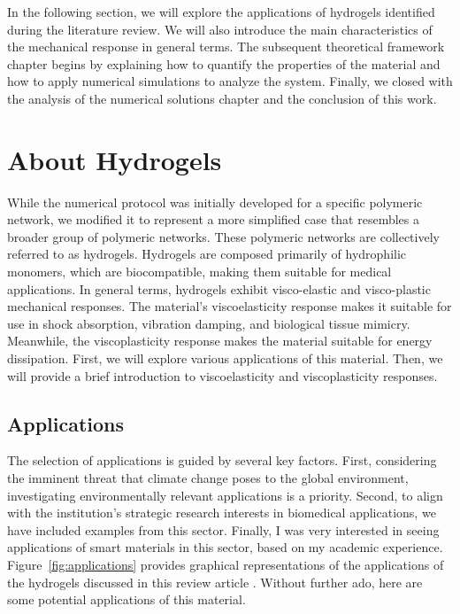 In the following section, we will explore the applications of hydrogels identified during the literature review. 
We will also introduce the main characteristics of the mechanical response in general terms.
The subsequent theoretical framework chapter begins by explaining how to quantify the properties of the material and how to apply numerical simulations to analyze the system.
Finally, we closed with the analysis of the numerical solutions chapter and the conclusion of this work.

\section{About Hydrogels}

While the numerical protocol was initially developed for a specific polymeric network, we modified it to represent a more simplified case that resembles a broader group of polymeric networks.
These polymeric networks are collectively referred to as hydrogels.
Hydrogels are composed primarily of hydrophilic monomers, which are biocompatible, making them suitable for medical applications.
In general terms, hydrogels exhibit visco-elastic and visco-plastic mechanical responses.
The material's viscoelasticity response makes it suitable for use in shock absorption, vibration damping, and biological tissue mimicry.
Meanwhile, the viscoplasticity response makes the material suitable for energy dissipation.
First, we will explore various applications of this material.
Then, we will provide a brief introduction to viscoelasticity and viscoplasticity responses.

\subsection{Applications}

The selection of applications is guided by several key factors. 
First, considering the imminent threat that climate change poses to the global environment, investigating environmentally relevant applications is a priority.
Second, to align with the institution's strategic research interests in biomedical applications, we have included examples from this sector.
Finally, I was very interested in seeing applications of smart materials in this sector, based on my academic experience.
Figure~\ref{fig:applications} provides graphical representations of the applications of the hydrogels discussed in this review article \citep{petelinsekToughHydrogelsLoadBearing2024}.
Without further ado, here are some potential applications of this material.

